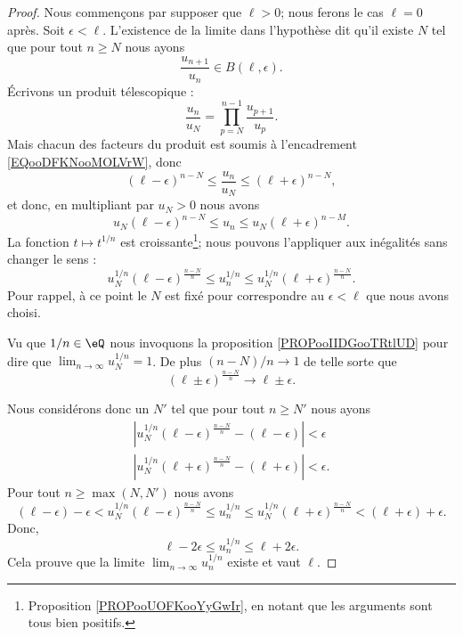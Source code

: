 \begin{proof}
	Nous commençons par supposer que \( \ell>0\); nous ferons le cas \( \ell=0\) après. Soit \( \epsilon<\ell\). L'existence de la limite dans l'hypothèse dit qu'il existe \( N\) tel que pour tout \( n\geq N\) nous ayons
	\begin{equation}        \label{EQooDFKNooMOLVrW}
		\frac{ u_{n+1} }{ u_n }\in B(\ell,\epsilon).
	\end{equation}
	Écrivons un produit télescopique :
	\begin{equation}
		\frac{ u_n }{ u_N }=\prod_{p=N}^{n-1}\frac{ u_{p+1} }{ u_p }.
	\end{equation}
	Mais chacun des facteurs du produit est soumis à l'encadrement \eqref{EQooDFKNooMOLVrW}, donc
	\begin{equation}
		(\ell-\epsilon)^{n-N}\leq \frac{ u_n }{ u_N }\leq (\ell+\epsilon)^{n-N},
	\end{equation}
	et donc, en multipliant par \( u_N>0\) nous avons
	\begin{equation}
		u_N(\ell-\epsilon)^{n-N}\leq  u_n  \leq u_N (\ell+\epsilon)^{n-M}.
	\end{equation}
	La fonction \( t\mapsto t^{1/n}\) est croissante\footnote{Proposition \ref{PROPooUOFKooYyGwIr}, en notant que les arguments sont tous bien positifs.}; nous pouvons l'appliquer aux inégalités sans changer le sens :
	\begin{equation}
		u_N^{1/n}(\ell-\epsilon)^{\frac{ n-N }{ n }}\leq u_n^{1/n}\leq u_N^{1/n}(\ell+\epsilon)^{\frac{ n-N }{ n }}.
	\end{equation}
	Pour rappel, à ce point le \( N\) est fixé pour correspondre au \( \epsilon<\ell\) que nous avons choisi.

	Vu que \( 1/n\in \eQ\) nous invoquons la proposition \ref{PROPooIIDGooTRtlUD} pour dire que \( \lim_{n\to \infty} u_N^{1/n}=1\). De plus \( (n-N)/n\to 1\) de telle sorte que
	\begin{equation}
		(\ell\pm \epsilon)^{\frac{ n-N }{ n }}\to\ell\pm\epsilon.
	\end{equation}

	Nous considérons donc un \( N'\) tel que pour tout \( n\geq N'\) nous ayons
	\begin{subequations}
		\begin{align}
			\left| u_N^{1/n}(\ell-\epsilon)^{\frac{ n-N }{ n }}-(\ell-\epsilon) \right| <\epsilon \\
			\left| u_N^{1/n}(\ell+\epsilon)^{\frac{ n-N }{ n }}-(\ell+\epsilon) \right| <\epsilon.
		\end{align}
	\end{subequations}
	Pour tout \( n\geq\max(N,N')\) nous avons
	\begin{equation}
		(\ell-\epsilon)-\epsilon<u_N^{1/n}(\ell-\epsilon)^{\frac{ n-N }{ n }}\leq u_n^{1/n}\leq u_N^{1/n}(\ell+\epsilon)^{\frac{ n-N }{ n }}<(\ell+\epsilon)+\epsilon.
	\end{equation}
	Donc,
	\begin{equation}
		\ell-2\epsilon\leq u_n^{1/n}\leq \ell+2\epsilon.
	\end{equation}
	Cela prouve que la limite \( \lim_{n\to \infty} u_n^{1/n}\) existe et vaut \( \ell\).


\end{proof}
